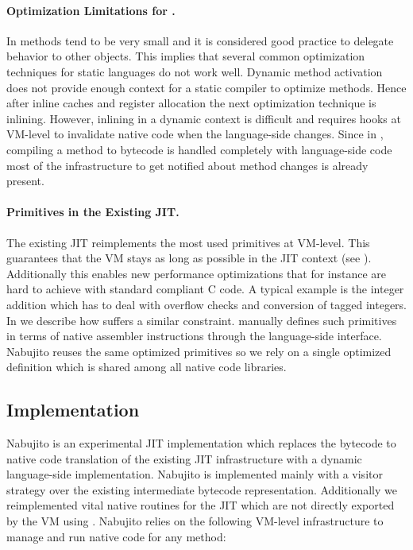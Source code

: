 \paragraph{Optimization Limitations for \PH.}
In \ST methods tend to be very small and it is considered good practice to delegate behavior to other objects.
This implies that several common optimization techniques for static languages do not work well.
Dynamic method activation does not provide enough context for a static compiler to optimize methods.
Hence after inline caches and register allocation the next optimization technique is inlining.
However, inlining in a dynamic context is difficult and requires hooks at VM-level to invalidate native code when the language-side changes.
Since in \PH, compiling a method to bytecode is handled completely with language-side code most of the infrastructure to get notified about method changes is already present.

\paragraph{Primitives in the Existing JIT.}
The existing JIT reimplements the most used primitives at VM-level.
This guarantees that the VM stays as long as possible in the JIT context (see ). Additionally this enables new performance optimizations that for instance are hard to achieve with standard compliant C code.
A typical example is the integer addition which has to deal with overflow checks and conversion of tagged integers.
In  we describe how \WF suffers a similar constraint.
\WF manually defines such primitives in terms of native assembler instructions through the language-side \B interface.
Nabujito reuses the same optimized primitives so we rely on a single optimized definition which is shared among all native code libraries.

\subsection{Implementation}
Nabujito is an experimental JIT implementation which replaces the bytecode to native code translation of the existing JIT infrastructure with a dynamic language-side implementation.
Nabujito is implemented mainly with a visitor strategy over the existing intermediate bytecode representation. 
Additionally we reimplemented vital native routines for the JIT which are not directly exported by the VM using \B. 
Nabujito relies on the following VM-level infrastructure to manage and run native code for any \PH method:

